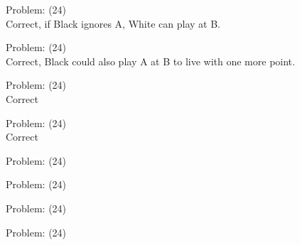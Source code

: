 \documentclass[11pt]{article}
\begin{document}
\begin{minipage}[t]{0.5\textwidth}
  {\centering
  
Problem: (24)\\
Correct, if Black ignores A, White can play at B.\\
  }
\end{minipage}
\begin{minipage}[t]{0.5\textwidth}
  {\centering
  
Problem: (24)\\
Correct, Black could also play A at B to live with one more point.\\
  }
\end{minipage}
\begin{minipage}[t]{0.5\textwidth}
  {\centering
  
Problem: (24)\\
Correct\\
  }
\end{minipage}
\begin{minipage}[t]{0.5\textwidth}
  {\centering
  
Problem: (24)\\
Correct\\
  }
\end{minipage}
\begin{minipage}[t]{0.5\textwidth}
  {\centering
  
Problem: (24)\\
  }
\end{minipage}
\begin{minipage}[t]{0.5\textwidth}
  {\centering
  
Problem: (24)\\
  }
\end{minipage}
\begin{minipage}[t]{0.5\textwidth}
  {\centering
  
Problem: (24)\\
  }
\end{minipage}
\begin{minipage}[t]{0.5\textwidth}
  {\centering
  
Problem: (24)\\
  }
\end{minipage}
\end{document}
